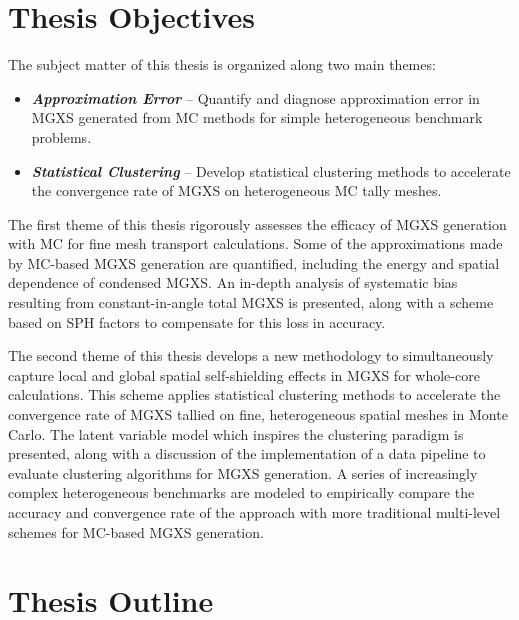 \section{Thesis Objectives}
\label{sec:chap1-objectives}

The subject matter of this thesis is organized along two main themes:

\begin{itemize}
\item \textbf{\textit{Approximation Error}} -- Quantify and diagnose approximation error in \ac{MGXS} generated from \ac{MC} methods for simple heterogeneous benchmark problems.
\item \textbf{\textit{Statistical Clustering}} -- Develop statistical clustering methods to accelerate the convergence rate of \ac{MGXS} on heterogeneous \ac{MC} tally meshes.
\end{itemize}

The first theme of this thesis rigorously assesses the efficacy of \ac{MGXS} generation with \ac{MC} for fine mesh transport calculations. Some of the approximations made by \ac{MC}-based \ac{MGXS} generation are quantified, including the energy and spatial dependence of condensed \ac{MGXS}. An in-depth analysis of systematic bias resulting from constant-in-angle total \ac{MGXS} is presented, along with a scheme based on \ac{SPH} factors to compensate for this loss in accuracy. 

The second theme of this thesis develops a new methodology to simultaneously capture local and global spatial self-shielding effects in \ac{MGXS} for whole-core calculations. This scheme applies statistical clustering methods to accelerate the convergence rate of \ac{MGXS} tallied on fine, heterogeneous spatial meshes in Monte Carlo. The latent variable model which inspires the clustering paradigm is presented, along with a discussion of the implementation of a data pipeline to evaluate clustering algorithms for \ac{MGXS} generation. A series of increasingly complex heterogeneous benchmarks are modeled to empirically compare the accuracy and convergence rate of the approach with more traditional multi-level schemes for \ac{MC}-based MGXS generation.


\section{Thesis Outline}
\label{sec:chap1-outline}


